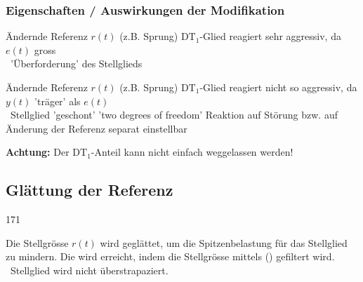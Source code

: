 \subsubsection{Eigenschaften / Auswirkungen der Modifikation}

\begin{minipage}[t]{0.48\columnwidth}
    \raggedright
    \begin{center}
        \textbf{}
    \end{center}

    \begin{outline}
        \1 Ändernde Referenz $r(t)$ (z.B. Sprung)
            \2 $\text{DT}_1$-Glied reagiert sehr aggressiv, da $e(t)$ gross \\
                \textrightarrow\ 'Überforderung' des Stellglieds
    \end{outline}

\end{minipage}
\hfill
\begin{minipage}[t]{0.48\columnwidth}
    \raggedright
    \begin{center}
        \textbf{}
    \end{center}

    \begin{outline}
        \1 Ändernde Referenz $r(t)$ (z.B. Sprung)
            \2 $\text{DT}_1$-Glied reagiert nicht so aggressiv, da $y(t)$ 'träger' als $e(t)$ \\
                \textrightarrow\  Stellglied 'geschont'
        \1 'two degrees of freedom'
            \2 Reaktion auf Störung bzw. auf Änderung der Referenz separat einstellbar
    \end{outline}
\end{minipage}

\textbf{Achtung:} Der $\text{DT}_1$-Anteil kann nicht einfach weggelassen werden! 


\subsection{Glättung der Referenz}{171}

\begin{minipage}[c]{0.38\columnwidth}
     
\end{minipage}
\hfill
\begin{minipage}[c]{0.6\columnwidth}
    Die Stellgrösse $r(t)$ wird geglättet, um die Spitzenbelastung für das Stellglied zu mindern. Die wird erreicht, indem die 
    Stellgrösse mittels () gefiltert wird. \textrightarrow\ Stellglied wird nicht überstrapaziert.
\end{minipage}


